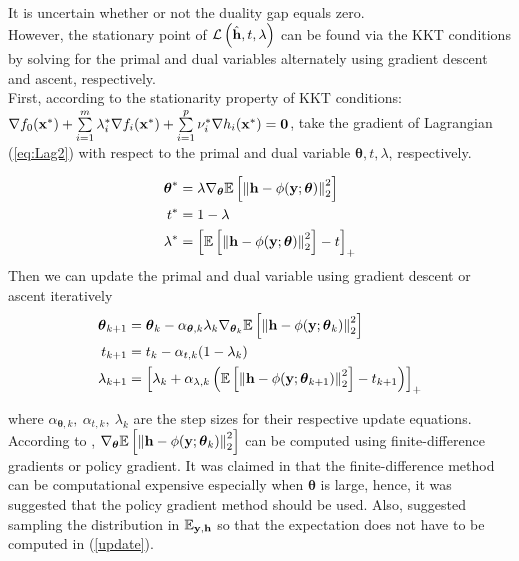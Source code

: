 \documentclass[journal,12pt,onecolumn,draftclsnofoot]{IEEEtran}
\begin{document}
        It is uncertain whether or not the duality gap equals zero.\\
        However, the stationary point of $  \mathcal{L} \left(\hat{{\bf h}},t,\lambda\right)$ can be found via the KKT conditions by solving for the primal and dual
        variables alternately using gradient descent and ascent, respectively.\\
        First, according to the stationarity property of KKT conditions:
        $\nabla f_0({\bf x}^*) + \sum\limits_{i=1}^{m}\lambda_i^*\nabla f_i({\bf x}^*) + \sum\limits_{i=1}^{p}\nu_i^*\nabla h_i({\bf x}^*) = {\bf 0}$,
        take the gradient of Lagrangian (\ref{eq:Lag2}) with respect to the primal and dual variable $\boldsymbol{\theta}, t, \lambda$, respectively.
        
        \begin{align} \label{stationarity}
            \boldsymbol{\theta}^* &= \lambda \nabla_{\boldsymbol{\theta}}
                \mathbb{E}\left[\left\| {\bf h}-\phi(\mathbf{y};\boldsymbol{\theta}) \right\|^2_2 \right]\\
            t^* &= 1-\lambda\\
            \lambda^* &= \left[ \mathbb{E}\left[\left\| {\bf h}-\phi(\mathbf{y};\boldsymbol{\theta}) \right\|^2_2 \right] -t\right]_{+}
        \end{align}
        Then we can update the primal and dual variable using gradient descent or ascent iteratively
        \begin{align} \label{update}
            \boldsymbol{\theta}_{k+1} &= \boldsymbol{\theta}_{k} - 
                \alpha_{\boldsymbol{\theta},k} \lambda_k \nabla_{\boldsymbol{\theta}_k}
                \mathbb{E}\left[\left\| {\bf h}-\phi(\mathbf{y};\boldsymbol{\theta}_k) \right\|^2_2 \right]\\
            t_{k+1} &= t_{k} - \alpha_{t,k}(1-\lambda_k)\\
            \lambda_{k+1} &= \left[ \lambda_k + \alpha_{\lambda,k}
                \left( \mathbb{E}\left[\left\| {\bf h}-\phi(\mathbf{y};\boldsymbol{\theta}_{k+1}) \right\|^2_2 \right] 
                -t_{k+1}\right)\right]_{+}
        \end{align}

        where $\alpha_{\boldsymbol{\theta},k},~ \alpha_{t,k},~ \lambda_k$ are the step sizes for their respective update equations.
        According to \cite{Eisen2019journal}, $\nabla_{\boldsymbol{\theta}}\mathbb{E}\left[\left\| {\bf h}-\phi(\mathbf{y};\boldsymbol{\theta}_k) \right\|^2_2 \right]$ 
        can be computed using finite-difference gradients or policy gradient.
        It was claimed in \cite{Eisen2019journal} that the finite-difference method can be
        computational expensive especially when $\boldsymbol{\theta}$ is large, hence, it was suggested that the policy gradient method should be used.
        Also, \cite{Eisen2020} suggested sampling the distribution in $\mathbb{E}_{{\bf y},{\bf h}}$ so that the expectation does not have to be computed in (\ref{update}).
\end{document}

